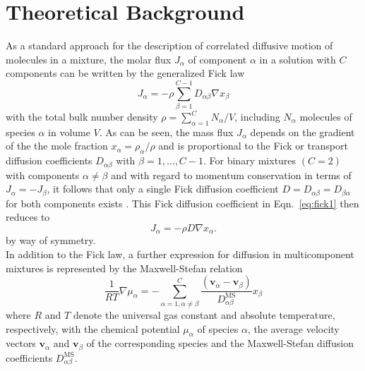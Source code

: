 \documentclass[aip,jcp,reprint]{revtex4-1}
\begin{document}
\section{Theoretical Background}
As a standard approach for  the description  of correlated diffusive motion of molecules in a mixture, the molar flux $J_{\alpha}$ of component $\alpha$ in a solution with $C$ components can be written by the generalized Fick law \cite{liu13a,bird04a}
\begin{equation}
\label{eq:fick1}
J_{\alpha}=- \rho \sum_{\beta=1}^{C-1} D_{\alpha\beta} \nabla x_{\beta}
\end{equation}
with the total bulk number density $\rho=\sum_{\alpha=1}^CN_{\alpha}/V$, including $N_{\alpha}$ molecules of species $\alpha$ in volume $V$. As can be seen, the mass flux $J_{\alpha}$ depends on the gradient of the the mole fraction $x_{\alpha}=\rho_{\alpha}/\rho$ and is proportional to the Fick or transport diffusion coefficients $D_{\alpha\beta}$ with $\beta=1,\ldots,C-1$. 
For binary mixtures $(C=2)$ with components $\alpha\neq \beta$ and with regard to momentum conservation in terms of  $J_{\alpha} = - J_{\beta}$,  it follows that only a single Fick diffusion coefficient $D=D_{\alpha\beta}=D_{\beta\alpha}$ for both components exists \cite{liu13a,taylor93a,newman12a}. This Fick diffusion coefficient in Eqn.~\eqref{eq:fick1} then reduces to
\begin{equation}
\label{eq:fickbin}
J_{\alpha}= -\rho D \nabla x_{\alpha}.
\end{equation}
by way of symmetry.\\
In addition to the Fick law, a further expression for diffusion in multicomponent mixtures \cite{liu13a} is  represented by the 
Maxwell-Stefan relation \cite{liu13a,bird04a}
\begin{equation}
\label{eq:msd}
\frac{1}{RT}\nabla\mu_{\alpha} = -\sum_{\alpha=1,\alpha\neq \beta}^{C}\frac{(\mathbf{v}_{\alpha}-\mathbf{v}_{\beta})}{D_{\alpha\beta}^{\text{MS}}}x_{\beta}
\end{equation}
where $R$ and $T$ denote the universal gas constant and absolute temperature, respectively, with the chemical potential $\mu_{\alpha}$ of species $\alpha$, the average velocity vectors $\mathbf{v}_{\alpha}$ and $\mathbf{v}_{\beta}$ of the corresponding species and the Maxwell-Stefan diffusion coefficients $D_{\alpha\beta}^{\text{MS}}$.
\end{document}
